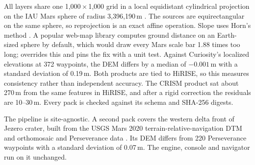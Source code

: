 All layers share one 1,000\,$\times$\,1,000 grid in a local equidistant cylindrical projection on the IAU Mars sphere of radius 3,396,190\,m \citep{archinal2018}. The sources are equirectangular on the same sphere, so reprojection is an exact affine operation. Slope uses Horn's method \citep{horn1981hill}. A popular web-map library computes ground distance on an Earth-sized sphere by default, which would draw every Mars scale bar 1.88 times too long; \Marswalk overrides this and pins the fix with a unit test. Against Curiosity's localized elevations at 372 waypoints, the DEM differs by a median of $-0.001$\,m with a standard deviation of 0.19\,m. Both products are tied to HiRISE, so this measures consistency rather than independent accuracy. The CRISM product sat about 270\,m from the same features in HiRISE, and after a rigid correction the residuals are 10--30\,m. Every pack is checked against its schema and SHA-256 digests.

The pipeline is site-agnostic. A second pack covers the western delta front of Jezero crater, built from the USGS Mars 2020 terrain-relative-navigation DTM and orthomosaic \citep{fergason2020trn} and Perseverance data \citep{farley2020}. Its DEM differs from 220 Perseverance waypoints with a standard deviation of 0.07\,m. The engine, console and navigator run on it unchanged.
